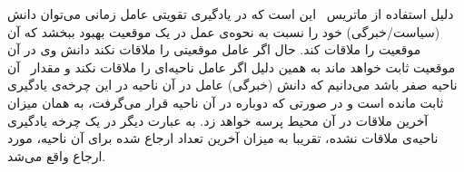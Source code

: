 دلیل استفاده از ماتریس \ این است که در یادگیری تقویتی عامل زمانی می‌توان دانش (سیاست/خبرگی) خود را نسبت به نحوه‌ی عمل در یک موقعیت بهبود ببخشد که آن موقعیت را ملاقات کند. حال اگر عامل موقعیتی را ملاقات نکند دانش وی در آن موقعیت ثابت خواهد ماند به همین دلیل اگر عامل ناحیه‌ای را ملاقات نکند و مقدار \ آن ناحیه صفر باشد می‌دانیم که دانش (خبرگی) عامل در آن ناحیه در این چرخه‌ی یادگیری ثابت مانده است و در صورتی که دوباره در آن ناحیه قرار می‌گرفت،  به همان میزان آخرین ملاقات در آن محیط پرسه خواهد زد. به عبارت دیگر در یک چرخه یادگیری ناحیه‌ی ملاقات نشده، تقریبا به میزان آخرین تعداد ارجاع شده برای آن ناحیه، مورد ارجاع واقع می‌شد.